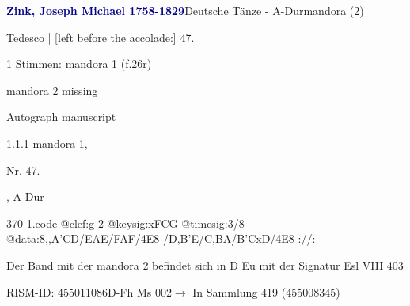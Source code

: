 \documentclass[twocolumn]{book}
\begin{document}
\par \vspace{7pt} \textcolor{darkblue}{\textbf{Zink, Joseph Michael  1758-1829}}\hfillplus{\textbf{[370]}}\newline Deutsche Tänze - A-Dur\newline mandora (2)
\par \begin{itshape}[f.26r, at left:] Tedesco | [left before the accolade:] 47.\end{itshape} 
\par \textcolor{darkblue}{}  1 Stimmen: mandora 1  (f.26r)\newline \begin{small} mandora 2 missing\end{small} \newline Autograph manuscript
\par 1.1.1  mandora 1, \begin{itshape}Nr. 47.\end{itshape}, A-Dur  
\begin{filecontents*}{370-1.code}
@clef:g-2
@keysig:xFCG
@timesig:3/8
@data:8,,A'CD/EAE/FAF/4E8-/D,B'E/C,BA/B'CxD/4E8-://:
\end{filecontents*}
\newline
%
\par Der Band mit der mandora 2 befindet sich in D Eu mit der Signatur Esl VIII 403
\par RISM-ID: 455011086\newline D-Fh  Ms 002\newline $\rightarrow$ In Sammlung 419 (455008345)
      
\end{document}
